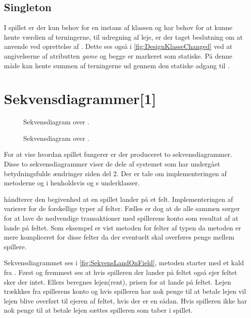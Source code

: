 \subsection{Singleton}\label{sec:desSingleton}
I spillet er der kun behov for en instans af klassen  og  har behov for at kunne hente værdien af terningerne, til udregning af leje, er der taget beslutning om at anvende  ved oprettelse af . Dette ses også i \vref{fig:DesignKlasseChanged} ved at angivelserne af atributten \textit{game} og  begge er markeret som statiske. På denne måde kan  hente summen af terningerne ud gennem den statiske adgang til . 

\section{Sekvensdiagrammer[1]}

\begin{figure}
\caption{Sekvensdiagram over .}
\label{fig:SekvensLandOnField}
\centering

\end{figure}

\begin{figure}
\caption{Sekvensdiagram over .}
\label{fig:SekvensOptToBuy}
\centering

\end{figure}
For at vise hvordan spillet fungerer er der produceret to sekvensdiagrammer. Disse to sekvensdiagrammer viser de dele af systemet som har undergået betydningsfulde ændringer siden del 2. Der er tale om implementeringen af metoderne  og  i henholdsvis  og s underklasser.

 håndterer den begivenhed at en spillet lander på et felt. Implementeringen af  varierer for de forskellige typer af felter. Fælles er dog at de alle sammen sørger for at lave de nødvendige transaktioner med spillerens konto som resultat af at lande på feltet. Som eksempel er vist metoden for felter af typen  da metoden er mere kompliceret for disse felter da der eventuelt skal overføres penge mellem spillere.

Sekvensdiagrammet ses i \vref{fig:SekvensLandOnField}, metoden starter med et kald fra . Først og fremmest ses at hvis spilleren der lander på feltet også ejer feltet sker der intet. Ellers beregnes lejen(rent), prisen for at lande på feltet. Lejen trækkkes fra spillerens konto og hvis spilleren har nok penge til at betale lejen vil lejen blive overført til ejeren af feltet, hvis der er en sådan. Hvis spilleren ikke har nok penge til at betale lejen sættes spilleren som taber i spillet.

